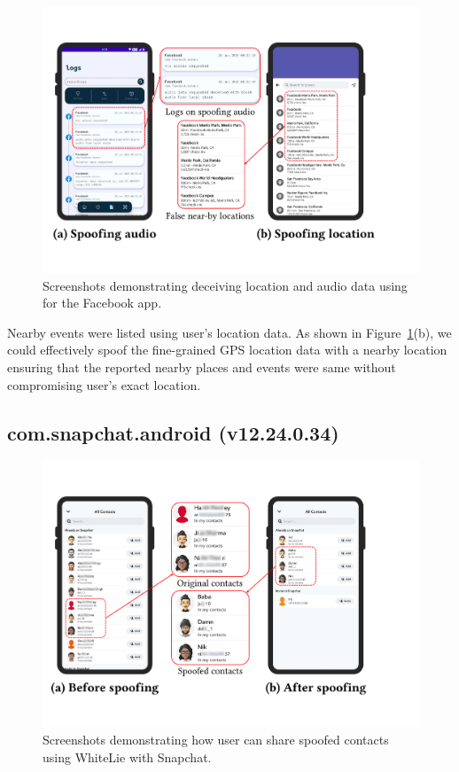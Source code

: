 \begin{figure}[t]
    \centering
    \includegraphics[width=0.75\linewidth]{Figures/Case Studies/facebook_screenshots.pdf}
    \caption{Screenshots demonstrating deceiving location and audio data using \framework{} for the Facebook app.}
    \label{fig:case-study-facebook}
\end{figure}

Nearby events were listed using user's location data. As shown in Figure~\ref{fig:case-study-facebook}(b), we could effectively spoof the fine-grained GPS location data with a nearby location ensuring that the reported nearby places and events were same without compromising user's exact location. 

\subsection{com.snapchat.android (v12.24.0.34)}
\label{sec:sc_case_study}

\begin{figure}[t]
    \centering
    \includegraphics[width=0.75\linewidth]{Figures/Case Studies/snapchat_screenshots.pdf}
    \caption{Screenshots demonstrating how user can share spoofed contacts using WhiteLie with Snapchat.}
    \label{fig:case-study-snapchat}
\end{figure}

